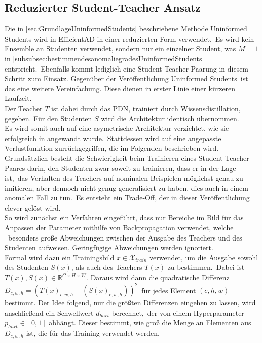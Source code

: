 \subsection{Reduzierter Student-Teacher Ansatz}
Die in \ref{sec:GrundlageUninformedStudents} beschriebene Methode \glqq Uninformed Students\grqq{} wird in EfficientAD in einer reduzierten Form verwendet.\
Es wird kein Ensemble an Studenten verwendet, sondern nur ein einzelner Student, was $M=1$ in \ref{subsubsec:bestimmendesanomaliegradesUninformedStudents} entspricht.\
Ebenfalls kommt lediglich eine Student-Teacher Paarung in diesem Schritt zum Einsatz. Gegenüber der Veröffentlichung \glqq Uninformed Students\grqq{}\cite{uninformedstudents}\ 
ist das eine weitere Vereinfachung. Diese dienen in erster Linie einer kürzeren Laufzeit.\\
Der Teacher $T$ ist dabei durch das PDN, trainiert durch Wissensdistillation, gegeben. Für den Studenten $S$ wird die Architektur identisch übernommen.\\
Es wird somit auch auf eine asymetrische Architektur verzichtet, wie sie erfolgreich in \cite{ast} angewandt wurde.\
Stattdessen wird auf eine angepasste Verlustfunktion zurrückgegriffen, die im Folgenden beschrieben wird.\\
Grundsätzlich besteht die Schwierigkeit beim Trainieren eines Student-Teacher Paares darin, den Studenten zwar soweit zu trainieren, dass er in der Lage ist,\
das Verhalten des Teachers auf nominalen Beispielen möglichst genau zu imitieren, aber dennoch nicht genug generalisiert zu haben, dies auch in einem anomalen Fall zu tun.\
Es entsteht ein Trade-Off, der in dieser Veröffentlichung clever gelöst wird.\\
So wird zunächst ein Verfahren eingeführt, dass nur Bereiche im Bild für das Anpassen der Parameter mithilfe von Backpropagation verwendet, welche \
besonders große Abweichungen zwischen der Ausgabe des Teachers und des Studenten aufweisen. Geringfügige Abweichungen werden ignoriert.\\
Formal wird dazu ein Trainingsbild $x \in \mathcal{X}_{train}$ verwendet, um die Ausgabe sowohl des Studenten $S(x)$, als auch des Teachers $T(x)$ zu bestimmen.\
Dabei ist $T(x), S(x) \in \mathbb{R}^{C \times H \times W}$. Daraus wird dann die quadratische Differenz $D_{c,w,h} = \left(T(x)_{c,w,h}-(S(x)_{c,w,h})\right)^{2}$\
für jedes Element $(c,h,w)$ bestimmt. Der Idee folgend, nur die größten Differenzen eingehen zu lassen, wird anschließend ein Schwellwert $d_{hart}$ berechnet,\
der von einem Hyperparameter $p_{hart} \in \left[0,1\right]$ abhängt. Dieser bestimmt, wie groß die Menge an Elementen aus $D_{c,w,h}$ ist, die für das Training verwendet werden.\
